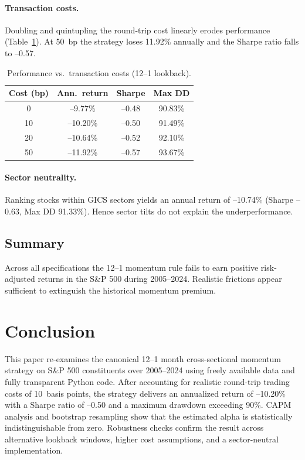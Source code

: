 \documentclass[11pt]{article}
\begin{document}
\paragraph{Transaction costs.}
Doubling and quintupling the round-trip cost linearly erodes performance (Table~\ref{tab:tc}).  
At 50~bp the strategy loses 11.92\% annually and the Sharpe ratio falls to --0.57.

\begin{table}[h!]
  \centering
  \begin{tabular}{cccc}
    \toprule
    Cost (bp) & Ann.\ return & Sharpe & Max DD \\ \midrule
    0  & --9.77\%  & --0.48 & 90.83\% \\
    10 & --10.20\% & --0.50 & 91.49\% \\
    20 & --10.64\% & --0.52 & 92.10\% \\
    50 & --11.92\% & --0.57 & 93.67\% \\ \bottomrule
  \end{tabular}
  \caption{Performance vs.\ transaction costs (12--1 lookback).}
  \label{tab:tc}
\end{table}

\paragraph{Sector neutrality.}
Ranking stocks within GICS sectors yields an annual return of --10.74\% (Sharpe --0.63, Max DD 91.33\%).  
Hence sector tilts do not explain the underperformance.

\subsection{Summary}
Across all specifications the 12--1 momentum rule fails to earn positive risk-adjusted returns in the S\&P 500 during 2005--2024.  
Realistic frictions appear sufficient to extinguish the historical momentum premium.

\section{Conclusion} \label{sec:concl}
This paper re-examines the canonical 12--1 month cross-sectional momentum strategy on S\&P 500 constituents over 2005--2024 using freely available data and fully transparent Python code.  
After accounting for realistic round-trip trading costs of 10~basis points, the strategy delivers an annualized return of --10.20\% with a Sharpe ratio of --0.50 and a maximum drawdown exceeding 90\%.  
CAPM analysis and bootstrap resampling show that the estimated alpha is statistically indistinguishable from zero.  
Robustness checks confirm the result across alternative lookback windows, higher cost assumptions, and a sector-neutral implementation.
\end{document}
